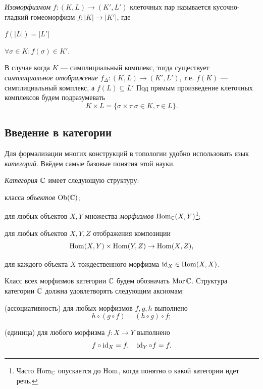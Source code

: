 \documentclass[10pt, twoside]{article}
\begin{document}
\emph{Изоморфизмом} $f\colon (K, L) \to (K', L')$ клеточных пар называется кусочно-гладкий гомеоморфизм $f\colon |K| \to |K'|$, где \begin{inumerate} 
    \item $f(|L|) = |L'|$
    \item $\forall \sigma \in K: f(\sigma) \in K'.$
\end{inumerate}

В случае когда $K$ --- симплициальный комплекс, тогда существует \emph{симплициальное отображение} $f_{\Delta}\colon (K, L) \to (K', L')$, т.е. $f(K)$ --- симплициальный комплекс, а $f(L) \subseteq L'$
Под прямым произведение клеточных комплексов будем подразумевать $$K \times L = \{\sigma \times \tau | \sigma \in K , \tau \in L\}.$$



\subsection{Введение в категории}
Для формализации многих конструкций в топологии удобно использовать язык \emph{категорий}. Ввёдем самые базовые понятия этой науки.

\begin{definition}
\emph{Категория} $\mathbb C$ имеет следующую структуру:
\begin{conditions}
    \item класса \emph{объектов} $\operatorname{Ob}(\mathbb C)$;
    \item для любых объектов $X, Y$ множества \emph{морфизмов} $\operatorname{Hom}_{\mathbb C}(X, Y)$\footnote{Часто $\operatorname{Hom}_\mathbb C$ опускается до $\operatorname{Hom}$, когда понятно о какой категории идет речь.};
    \item для любых объектов $X, Y, Z$ отображения композиции
    \[
        \operatorname{Hom}(X,Y) \times \operatorname{Hom}(Y,Z) \to \operatorname{Hom}(X,Z),
    \]
    \item для каждого объекта $X$ тождественного морфизма $\operatorname{id}_X \in \operatorname{Hom}(X,X)$.
\end{conditions}
Класс всех морфизмов категории $\mathbb C$ будем обозначать $\operatorname{Mor}\mathbb C$.
Структура категории $\mathbb C$ должна удовлетворять следующим аксиомам:
\begin{conditions}
    \item (ассоциативность) для любых морфизмов $f, g, h$ выполнено
    \[
        h \circ (g \circ f) = (h \circ g) \circ f;
    \]
    \item (единица) для любого морфизма $f : X \to Y$ выполнено
    \[
        f \circ \operatorname{id}_X = f, \quad \operatorname{id}_Y \circ f = f.
    \]
\end{conditions}
\end{definition}
\end{document}
